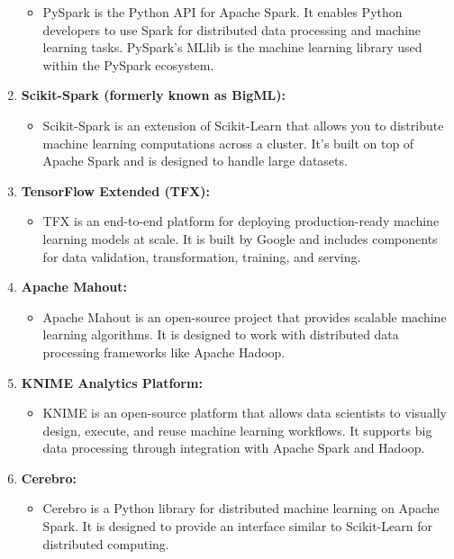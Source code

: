 \documentclass[
]{book}
\providecommand{\tightlist}{%
  \setlength{\itemsep}{0pt}\setlength{\parskip}{0pt}}
\begin{document}
\begin{enumerate}
  \begin{itemize}
  \tightlist
  \item
    PySpark is the Python API for Apache Spark. It enables Python developers to use Spark for distributed data processing and machine learning tasks. PySpark's MLlib is the machine learning library used within the PySpark ecosystem.
  \end{itemize}
\item
  \textbf{Scikit-Spark (formerly known as BigML):}

  \begin{itemize}
  \tightlist
  \item
    Scikit-Spark is an extension of Scikit-Learn that allows you to distribute machine learning computations across a cluster. It's built on top of Apache Spark and is designed to handle large datasets.
  \end{itemize}
\item
  \textbf{TensorFlow Extended (TFX):}

  \begin{itemize}
  \tightlist
  \item
    TFX is an end-to-end platform for deploying production-ready machine learning models at scale. It is built by Google and includes components for data validation, transformation, training, and serving.
  \end{itemize}
\item
  \textbf{Apache Mahout:}

  \begin{itemize}
  \tightlist
  \item
    Apache Mahout is an open-source project that provides scalable machine learning algorithms. It is designed to work with distributed data processing frameworks like Apache Hadoop.
  \end{itemize}
\item
  \textbf{KNIME Analytics Platform:}

  \begin{itemize}
  \tightlist
  \item
    KNIME is an open-source platform that allows data scientists to visually design, execute, and reuse machine learning workflows. It supports big data processing through integration with Apache Spark and Hadoop.
  \end{itemize}
\item
  \textbf{Cerebro:}

  \begin{itemize}
  \tightlist
  \item
    Cerebro is a Python library for distributed machine learning on Apache Spark. It is designed to provide an interface similar to Scikit-Learn for distributed computing.
  \end{itemize}
\end{enumerate}
\end{document}
